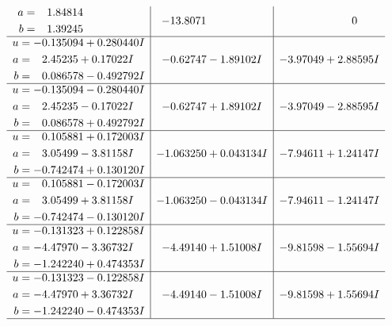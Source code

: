 \documentclass[1p]{elsarticle_modified}
\theoremstyle{definition}
\begin{document}
$$\begin{array}{c|c|c}
\begin{aligned}
a &= \phantom{-}1.84814\phantom{ +0.000000I} \\
b &= \phantom{-}1.39245\phantom{ +0.000000I}\end{aligned}
 & -13.8071\phantom{ +0.000000I} & \phantom{-0.000000 } 0 \\ \hline\begin{aligned}
u &= -0.135094 + 0.280440 I \\
a &= \phantom{-}2.45235 + 0.17022 I \\
b &= \phantom{-}0.086578 - 0.492792 I\end{aligned}
 & -0.62747 - 1.89102 I & -3.97049 + 2.88595 I \\ \hline\begin{aligned}
u &= -0.135094 - 0.280440 I \\
a &= \phantom{-}2.45235 - 0.17022 I \\
b &= \phantom{-}0.086578 + 0.492792 I\end{aligned}
 & -0.62747 + 1.89102 I & -3.97049 - 2.88595 I \\ \hline\begin{aligned}
u &= \phantom{-}0.105881 + 0.172003 I \\
a &= \phantom{-}3.05499 - 3.81158 I \\
b &= -0.742474 + 0.130120 I\end{aligned}
 & -1.063250 + 0.043134 I & -7.94611 + 1.24147 I \\ \hline\begin{aligned}
u &= \phantom{-}0.105881 - 0.172003 I \\
a &= \phantom{-}3.05499 + 3.81158 I \\
b &= -0.742474 - 0.130120 I\end{aligned}
 & -1.063250 - 0.043134 I & -7.94611 - 1.24147 I \\ \hline\begin{aligned}
u &= -0.131323 + 0.122858 I \\
a &= -4.47970 - 3.36732 I \\
b &= -1.242240 + 0.474353 I\end{aligned}
 & -4.49140 + 1.51008 I & -9.81598 - 1.55694 I \\ \hline\begin{aligned}
u &= -0.131323 - 0.122858 I \\
a &= -4.47970 + 3.36732 I \\
b &= -1.242240 - 0.474353 I\end{aligned}
 & -4.49140 - 1.51008 I & -9.81598 + 1.55694 I\\
 \hline 
 \end{array}$$\newpage\newpage\renewcommand{\arraystretch}{1}
\end{document}
